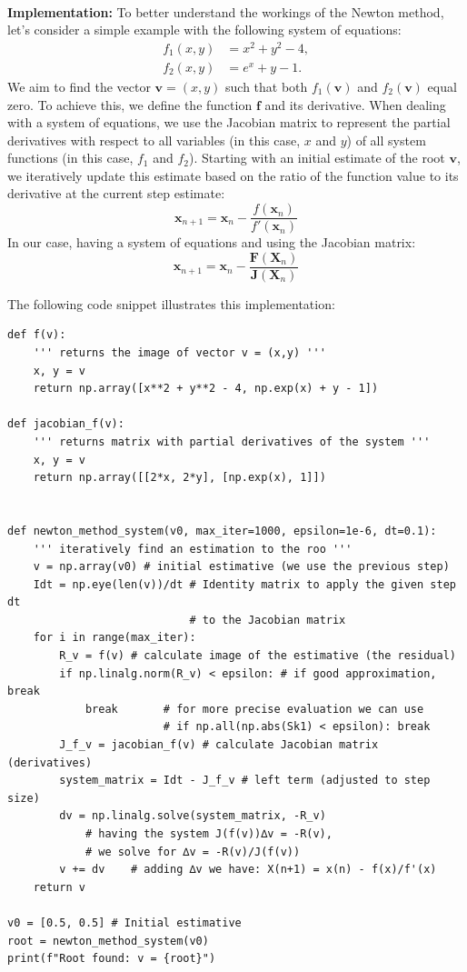\documentclass[runningheads]{llncs}
\begin{document}
\textbf{\\Implementation:} To better understand the workings of the Newton method, let's consider a simple example with the following system of equations:
\[
\begin{aligned}
f_1(x,y) &= x^2 + y^2 - 4, \\
f_2(x,y) &= e^x + y - 1.
\end{aligned}
\]
We aim to find the vector \( \mathbf{v} = (x, y) \) such that both \( f_1(\mathbf{v}) \) and \( f_2(\mathbf{v}) \) equal zero. To achieve this, we define the function \( \mathbf{f} \) and its derivative. When dealing with a system of equations, we use the Jacobian matrix to represent the partial derivatives with respect to all variables (in this case, \( x \) and \( y \)) of all system functions (in this case, \( f_1 \) and \( f_2 \)). Starting with an initial estimate of the root \( \mathbf{v} \), we iteratively update this estimate based on the ratio of the function value to its derivative at the current step estimate:
\[
\mathbf{x}_{n+1} = \mathbf{x}_n - \frac{f(\mathbf{x}_n)}{f'(\mathbf{x}_n)}
\]
In our case, having a system of equations and using the Jacobian matrix:
\[
\mathbf{x}_{n+1} = \mathbf{x}_n - \frac{\mathbf{F}(\mathbf{X}_n)}{\mathbf{J}(\mathbf{X}_n)}
\]

\noindent The following code snippet illustrates this implementation:

\begin{verbatim}
def f(v): 
    ''' returns the image of vector v = (x,y) '''
    x, y = v
    return np.array([x**2 + y**2 - 4, np.exp(x) + y - 1])

def jacobian_f(v): 
    ''' returns matrix with partial derivatives of the system ''' 
    x, y = v
    return np.array([[2*x, 2*y], [np.exp(x), 1]])


def newton_method_system(v0, max_iter=1000, epsilon=1e-6, dt=0.1):
    ''' iteratively find an estimation to the roo '''
    v = np.array(v0) # initial estimative (we use the previous step) 
    Idt = np.eye(len(v))/dt # Identity matrix to apply the given step dt
                            # to the Jacobian matrix 
    for i in range(max_iter):
        R_v = f(v) # calculate image of the estimative (the residual)  
        if np.linalg.norm(R_v) < epsilon: # if good approximation, break
            break       # for more precise evaluation we can use 		
                        # if np.all(np.abs(Sk1) < epsilon): break
        J_f_v = jacobian_f(v) # calculate Jacobian matrix (derivatives)
        system_matrix = Idt - J_f_v # left term (adjusted to step size) 
        dv = np.linalg.solve(system_matrix, -R_v) 
            # having the system J(f(v))∆v = -R(v), 
            # we solve for ∆v = -R(v)/J(f(v))            
        v += dv    # adding ∆v we have: X(n+1) = x(n) - f(x)/f'(x)   
    return v

v0 = [0.5, 0.5] # Initial estimative
root = newton_method_system(v0)
print(f"Root found: v = {root}")
\end{verbatim} 
\end{document}
